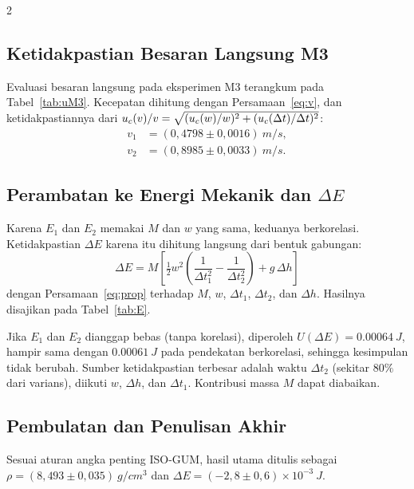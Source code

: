 \documentclass[a4paper, 12pt]{article}
\begin{document}
\begin{multicols}{2}
    \raggedcolumns
        \subsection{Ketidakpastian Besaran Langsung M3}
        Evaluasi besaran langsung pada eksperimen M3 terangkum pada Tabel~\ref{tab:uM3}. Kecepatan dihitung dengan Persamaan~\eqref{eq:v}, dan ketidakpastiannya dari $u_{c}(v)/v=\sqrt{(u_{c}(w)/w)^2+(u_{c}(\Delta t)/\Delta t)^2}$:
        \begin{align*}
            v_1 &= (0{,}4798\pm0{,}0016)\ \si{m/s},\\
            v_2 &= (0{,}8985\pm0{,}0033)\ \si{m/s}.
        \end{align*}

        \subsection{Perambatan ke Energi Mekanik dan \texorpdfstring{$\Delta E$}{Delta E}}
        Karena $E_1$ dan $E_2$ memakai $M$ dan $w$ yang sama, keduanya berkorelasi. Ketidakpastian $\Delta E$ karena itu dihitung langsung dari bentuk gabungan:
        \begin{equation}
            \Delta E=M\left[\tfrac{1}{2}w^{2}\left(\frac{1}{\Delta t_1^{2}}-\frac{1}{\Delta t_2^{2}}\right)+g\,\Delta h\right]
            \label{eq:dEfull}
        \end{equation}
        dengan Persamaan~\eqref{eq:prop} terhadap $M$, $w$, $\Delta t_1$, $\Delta t_2$, dan $\Delta h$. Hasilnya disajikan pada Tabel~\ref{tab:E}.

        Jika $E_1$ dan $E_2$ dianggap bebas (tanpa korelasi), diperoleh $U(\Delta E)=\SI{0,00064}{J}$, hampir sama dengan $\SI{0,00061}{J}$ pada pendekatan berkorelasi, sehingga kesimpulan tidak berubah. Sumber ketidakpastian terbesar adalah waktu $\Delta t_2$ (sekitar $80\%$ dari varians), diikuti $w$, $\Delta h$, dan $\Delta t_1$. Kontribusi massa $M$ dapat diabaikan.

        \subsection{Pembulatan dan Penulisan Akhir}
        Sesuai aturan angka penting ISO-GUM, hasil utama ditulis sebagai $\rho=(8{,}493\pm0{,}035)\ \si{g/cm^3}$ dan $\Delta E=(-2{,}8\pm0{,}6)\times10^{-3}\ \si{J}$.
\end{multicols}
\end{document}
